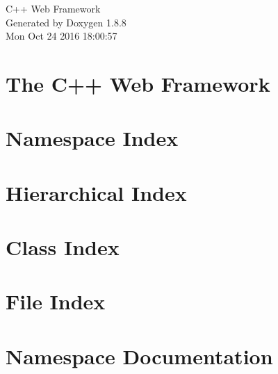 \documentclass[twoside]{book}
\newcommand{\+}{\discretionary{\mbox{\scriptsize$\hookleftarrow$}}{}{}}
\newcommand{\clearemptydoublepage}{%
  \newpage{\pagestyle{empty}\cleardoublepage}%
}
\begin{document}
\hypersetup{pageanchor=false,
             bookmarks=true,
             bookmarksnumbered=true,
             pdfencoding=unicode
            }
\begin{titlepage}
\vspace*{7cm}
\begin{center}%
{\Large C++ Web Framework }\\
\vspace*{1cm}
{\large Generated by Doxygen 1.8.8}\\
\vspace*{0.5cm}
{\small Mon Oct 24 2016 18:00:57}\\
\end{center}
\end{titlepage}
\clearemptydoublepage
\tableofcontents
\clearemptydoublepage
{}
\hypersetup{pageanchor=true}

\chapter{The C++ Web Framework}
\label{index}\hypertarget{index}{}
\chapter{Namespace Index}

\chapter{Hierarchical Index}

\chapter{Class Index}

\chapter{File Index}

\chapter{Namespace Documentation}

\end{document}
